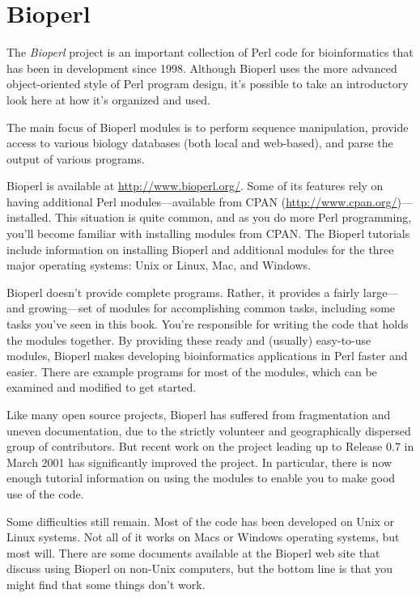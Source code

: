 \section{Bioperl}
The \textit{Bioperl} project is an important collection of Perl code for bioinformatics that has been in development since 1998. Although Bioperl uses the more advanced object-oriented style of Perl program design, it's possible to take an introductory look here at how it's organized and used.

The main focus of Bioperl modules is to perform sequence manipulation, provide access to various biology databases (both local and web-based), and parse the output of various programs.

Bioperl is available at \href{http://www.bioperl.org/}{http://www.bioperl.org/}. Some of its features rely on having additional Perl modules—available from CPAN (\href{http://www.cpan.org/}{http://www.cpan.org/})—installed. This situation is quite common, and as you do more Perl programming, you'll become familiar with installing modules from CPAN. The Bioperl tutorials include information on installing Bioperl and additional modules for the three major operating systems: Unix or Linux, Mac, and Windows.

Bioperl doesn't provide complete programs. Rather, it provides a fairly large—and growing—set of modules for accomplishing common tasks, including some tasks you've seen in this book. You're responsible for writing the code that holds the modules together. By providing these ready and (usually) easy-to-use modules, Bioperl makes developing bioinformatics applications in Perl faster and easier. There are example programs for most of the modules, which can be examined and modified to get started.

Like many open source projects, Bioperl has suffered from fragmentation and uneven documentation, due to the strictly volunteer and geographically dispersed group of contributors. But recent work on the project leading up to Release 0.7 in March 2001 has significantly improved the project. In particular, there is now enough tutorial information on using the modules to enable you to make good use of the code.

Some difficulties still remain. Most of the code has been developed on Unix or Linux systems. Not all of it works on Macs or Windows operating systems, but most will. There are some documents available at the Bioperl web site that discuss using Bioperl on non-Unix computers, but the bottom line is that you might find that some things don't work.

